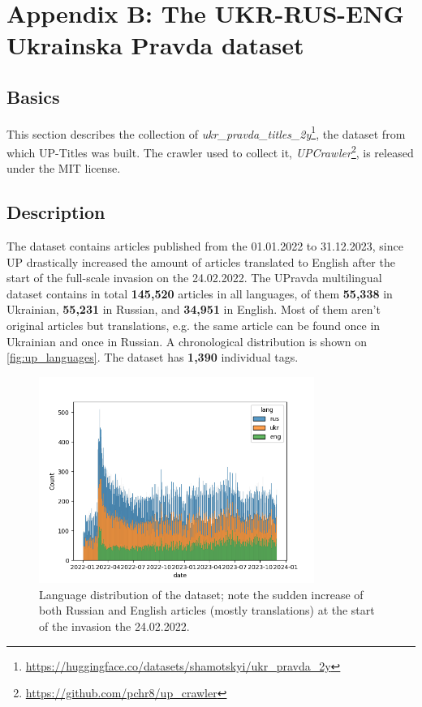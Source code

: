 \chapter{Appendix B: The 
UKR-RUS-ENG Ukrainska Pravda dataset}\label{app:pravda}

\section{Basics}
This section describes the collection of \textit{ukr\_pravda\_titles\_2y}\footnote{\href{https://huggingface.co/datasets/shamotskyi/ukr_pravda_2y}{https://huggingface.co/datasets/shamotskyi/ukr\_pravda\_2y}}, the dataset 
from which UP-Titles was built.
The crawler used to collect it, \textit{UPCrawler}\footnote{\href{https://github.com/pchr8/up_crawler}{https://github.com/pchr8/up\_crawler}},
is released under the MIT license.

\section{Description}
The dataset contains articles published from the 01.01.2022 to 31.12.2023, since UP drastically increased the amount of articles translated to English after the start of the full-scale invasion on the 24.02.2022.
The UPravda multilingual dataset contains in total \textbf{145,520} articles in all languages, of them \textbf{55,338} in Ukrainian, \textbf{55,231} in Russian, and \textbf{34,951} in English. Most of them aren't original articles but translations, e.g. the same article can be found once in Ukrainian and once in Russian. A chronological distribution is shown on \autoref{fig:up_languages}.
The dataset has \textbf{1,390} individual tags.

\begin{figure}[ht]
    \centering
    \includegraphics[width=0.8\textwidth]{Figures/up_ds_langs.png}
    \caption[Language distribution of the ukr\_pravda\_2y dataset]{Language distribution of the dataset; note the sudden increase of both Russian and English articles (mostly translations) at the start of the invasion the 24.02.2022.}
    \label{fig:up_languages}
\end{figure}



